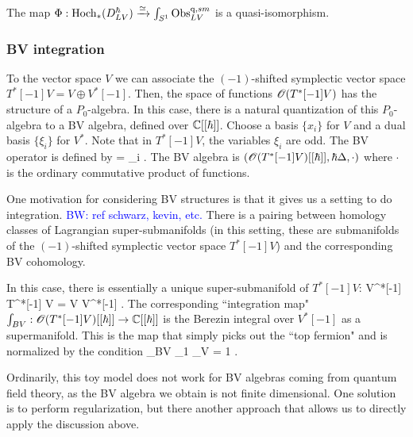 \documentclass[10pt]{amsart}
\def\brian{\textcolor{blue}{BW: }\textcolor{blue}}
\begin{document}
\begin{prop}\cite{GLL} 
The map $\Phi : {\rm Hoch}_*(D^{\hbar}_{LV}) \xrightarrow{\simeq} \int_{S^1} {\rm Obs}^{{\rm q},sm}_{LV}$ is a quasi-isomorphism.
\end{prop}

\subsubsection{BV integration}

To the vector space $V$ we can associate the $(-1)$-shifted symplectic vector space $T^*[-1] V = V \oplus V^*[-1]$. 
Then, the space of functions $\mathscr O(T^*[-1]V)$ has the structure of a $P_0$-algebra. 
In this case, there is a natural quantization of this $P_0$-algebra to a BV algebra, defined over $\mathbb C[[\hbar]]$. 
Choose a basis $\{x_i\}$ for $V$ and a dual basis $\{\xi_i\}$ for $V^*$. 
Note that in $T^*[-1] V$, the variables $\xi_i$ are odd.
The BV operator is defined by
\ben
\Delta = \sum_i   .
\een 
The BV algebra is $(\mathscr O(T^*[-1]V)[[\hbar]], \hbar \Delta, \cdot)$ where $\cdot$ is the ordinary commutative product of functions. 

One motivation for considering BV structures is that it gives us a setting to do integration. \brian{ref schwarz, kevin, etc.}
There is a pairing between homology classes of Lagrangian super-submanifolds (in this setting, these are submanifolds of the $(-1)$-shifted symplectic vector space $T^*[-1] V$) and the corresponding BV cohomology. 

In this case, there is essentially a unique super-submanifold of $T^*[-1] V$:
\ben
V^*[-1] \subset T^*[-1] V = V \oplus V^*[-1] .
\een 
The corresponding ``integration map" $\int_{BV} : \mathscr O(T^*[-1]V)[[\hbar]] \to \mathbb C[[\hbar]]$ is the Berezin integral over $V^*[-1]$ as a supermanifold.
This is the map that simply picks out the ``top fermion" and is normalized by the condition
\ben
\int_{BV} \xi_1 \cdots \xi_{\dim V} = 1 .
\een

Ordinarily, this toy model does not work for BV algebras coming from quantum field theory, as the BV algebra we obtain is not finite dimensional. 
One solution is to perform regularization, but there another approach that allows us to directly apply the discussion above. 
\end{document}
